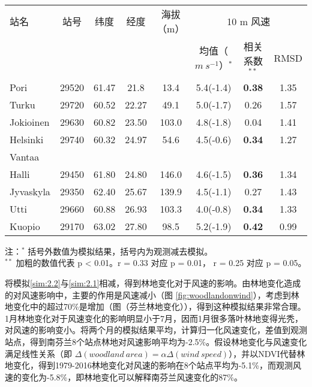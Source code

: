 \begin{table}[!htbp]
    \label{tab:Finlandstationinfo}
    \centering
    \small%
    \setlength{\tabcolsep}{5 pt}%
    \renewcommand{\arraystretch}{1.0}%
    \begin{tabular}{lccccccc}
        \hline
        站名 & 站号 & 纬度 & 经度 & 海拔（m）&  \multicolumn{3}{c}{10 m 风速} \\
         & & & & & 均值（$m ~ s^{-1}$）$^*$ &  相关系数 $^ {**}$ & RMSD \\
        \hline
        Pori & 29520 & 61.47 & 21.8 & 13.4 & 5.4(-1.4) & \textbf{0.38} & 1.35 \\
        Turku & 29720 & 60.52 & 22.27 & 49.1 & 5.0(-1.7) & 0.26 & 1.57 \\
        Jokioinen & 29630 & 60.82 & 23.50 & 103.0 & 4.8(-1.8) & 0.04 & 1.41 \\
        Helsinki & 29740 & 60.32 & 24.97 & 54.6 & 4.5(-0.6) & \textbf{0.34} & 1.27 \\
        Vantaa & & & & & & \\
        Halli & 29450 & 61.80 & 24.80 & 146.0 & 4.6(-1.5) & \textbf{0.36} & 1.34 \\
        Jyvaskyla & 29350 & 62.40 & 25.67 & 139.9 & 4.5(-1.1) & 0.27 & 1.43 \\
        Utti & 29660 & 60.88 & 26.93 & 103.3 & 4.0(-0.8) & \textbf{0.34} & 1.33 \\
        Kuopio & 29170 & 63.02 & 27.80 & 98.5 & 5.2(-1.9) & \textbf{0.42} & 0.99 \\ 
        \hline
    \end{tabular}
    \vspace*{3ex}
    \begin{minipage}{0.9\textwidth}%
    注：$^*$ 括号外数值为模拟结果，括号内为观测减去模拟。\\ 
    $^{**}$ 加粗的数值代表 p < 0.01。r = 0.33 对应 p = 0.01， r = 0.25 对应 p = 0.05。
    \end{minipage}
\end{table}


将模拟\ref{sim:2.2}与\ref{sim:2.1}相减，得到林地变化对于风速的影响。由林地变化造成的对风速影响中，主要的作用是风速减小（图 \ref{fig:woodlandonwind}），考虑到林地变化中的超过70\%是增加（图（芬兰林地变化）），得到这种模拟结果非常合理。1月林地变化对于风速变化的影响明显小于7月，因而1月很多落叶林地变得光秃，对风速的影响变小。将两个月的模拟结果平均，计算归一化风速变化，差值到观测站点，得到南芬兰8个站点林地对风速影响平均为-2.5\%。假设林地变化与风速变化满足线性关系（即 $\Delta(woodland ~ area) = \alpha \Delta(wind ~ speed)$），并以NDVI代替林地变化，得到1979-2016林地变化对风速的影响在8个站点平均为-5.1\%，而观测风速的变化为-5.8\%，即林地变化可以解释南芬兰风速变化的87\%。

